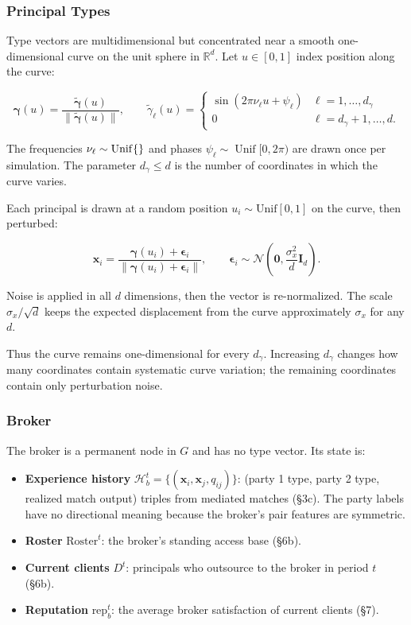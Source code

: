 \documentclass[11pt]{article}
\providecommand{\tightlist}{%
  \setlength{\itemsep}{0pt}\setlength{\parskip}{0pt}}
\begin{document}
\subsubsection{Principal Types}\label{agent-types}

Type vectors are multidimensional but concentrated near a smooth one-dimensional curve on the unit sphere in \(\mathbb{R}^d\). Let \(u \in [0,1]\) index position along the curve:

\[\boldsymbol{\gamma}(u) = \frac{\tilde{\boldsymbol{\gamma}}(u)}{\|\tilde{\boldsymbol{\gamma}}(u)\|}, \qquad \tilde{\gamma}_\ell(u) = \begin{cases} \sin(2\pi \nu_\ell u + \psi_\ell) & \ell = 1, \ldots, d_\gamma \\ 0 & \ell = d_\gamma+1, \ldots, d. \end{cases}\]

The frequencies \(\nu_\ell \sim \operatorname{Unif}\{\pv{settingFrequencies}\}\) and phases \(\psi_\ell \sim \operatorname{Unif}[0,2\pi)\) are drawn once per simulation. The parameter \(d_\gamma\leq d\) is the number of coordinates in which the curve varies.

Each principal is drawn at a random position \(u_i \sim \mathrm{Unif}[0,1]\) on the curve, then perturbed:

\[\mathbf{x}_i = \frac{\boldsymbol{\gamma}(u_i) + \boldsymbol{\epsilon}_i}{\|\boldsymbol{\gamma}(u_i) + \boldsymbol{\epsilon}_i\|}, \qquad \boldsymbol{\epsilon}_i \sim \mathcal{N}\!\left(\mathbf{0}, \frac{\sigma_x^2}{d} \mathbf{I}_d\right).\]

Noise is applied in all \(d\) dimensions, then the vector is re-normalized. The scale \(\sigma_x / \sqrt{d}\) keeps the expected displacement from the curve approximately \(\sigma_x\) for any \(d\).

Thus the curve remains one-dimensional for every \(d_\gamma\). Increasing \(d_\gamma\) changes how many coordinates contain systematic curve variation; the remaining coordinates contain only perturbation noise.

\subsubsection{Broker}\label{broker}

The broker is a permanent node in \(G\) and has no type vector. Its state is:

\begin{itemize}
\tightlist
\item \textbf{Experience history} \(\mathcal{H}_b^t = \{(\mathbf{x}_i, \mathbf{x}_j, q_{ij})\}\): (party 1 type, party 2 type, realized match output) triples from mediated matches (§3c). The party labels have no directional meaning because the broker's pair features are symmetric.
\item \textbf{Roster} \(\text{Roster}^t\): the broker's standing access base (§6b).
\item \textbf{Current clients} \(D^t\): principals who outsource to the broker in period \(t\) (§6b).
\item \textbf{Reputation} \(\text{rep}_b^t\): the average broker satisfaction of current clients (§7).
\end{itemize}
\end{document}
